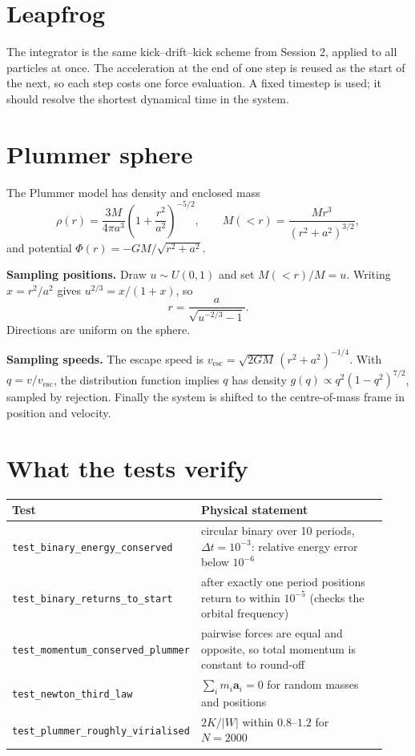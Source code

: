 

\section{Leapfrog}
The integrator is the same kick--drift--kick scheme from Session 2, applied to all particles at once. The acceleration at the end of one step is reused as the start of the next, so each step costs one force evaluation. A fixed timestep is used; it should resolve the shortest dynamical time in the system.


\section{Plummer sphere}
The Plummer model has density and enclosed mass
\[
\rho(r)=\frac{3M}{4\pi a^3}\left(1+\frac{r^2}{a^2}\right)^{-5/2},\qquad
M(<r)=\frac{Mr^3}{(r^2+a^2)^{3/2}},
\]
and potential $\Phi(r)=-GM/\sqrt{r^2+a^2}$.

\textbf{Sampling positions.} Draw $u\sim U(0,1)$ and set $M(<r)/M=u$. Writing $x=r^2/a^2$ gives $u^{2/3}=x/(1+x)$, so
\[
r=\frac{a}{\sqrt{u^{-2/3}-1}} .
\]
Directions are uniform on the sphere.

\textbf{Sampling speeds.} The escape speed is $v_{\mathrm{esc}}=\sqrt{2GM}\,(r^2+a^2)^{-1/4}$. With $q=v/v_{\mathrm{esc}}$, the distribution function implies $q$ has density $g(q)\propto q^2(1-q^2)^{7/2}$, sampled by rejection. Finally the system is shifted to the centre-of-mass frame in position and velocity.



\section{What the tests verify}
\begin{center}
\begin{tabular}{@{}p{0.38\linewidth}p{0.55\linewidth}@{}}
\toprule
Test & Physical statement \\ \midrule
\texttt{test\_binary\_energy\_conserved} & circular binary over 10 periods, $\Delta t=10^{-3}$: relative energy error below $10^{-6}$ \\
\texttt{test\_binary\_returns\_to\_start} & after exactly one period positions return to within $10^{-5}$ (checks the orbital frequency) \\
\texttt{test\_momentum\_conserved\_plummer} & pairwise forces are equal and opposite, so total momentum is constant to round-off \\
\texttt{test\_newton\_third\_law} & $\sum_i m_i\mathbf a_i=0$ for random masses and positions \\
\texttt{test\_plummer\_roughly\_virialised} & $2K/|W|$ within $0.8$--$1.2$ for $N=2000$ \\
\bottomrule
\end{tabular}
\end{center}


